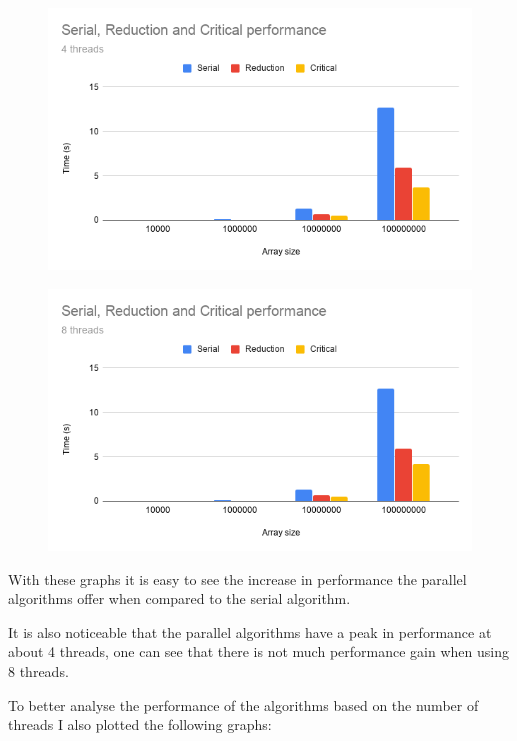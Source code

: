 \documentclass[unicode,11pt,a4paper,oneside,numbers=endperiod,openany]{scrartcl}
\begin{document}
\begin{enumerate}
        \begin{figure}[H]
            \centering
            \includegraphics[width=0.9\linewidth]{"Serial, Reduction and Critical Performance-3"}
        \end{figure}

        \begin{figure}[H]
            \centering
            \includegraphics[width=0.9\linewidth]{"Serial, Reduction and Critical Performance-4"}
        \end{figure}

    With these graphs it is easy to see the increase in performance the parallel algorithms offer when compared to the serial algorithm. 

    It is also noticeable that the parallel algorithms have a peak in performance at about 4 threads, one can see that there is not much performance gain when using 8 threads.


    To better analyse the performance of the algorithms based on the number of threads I also plotted the following graphs:


\end{enumerate}
\end{document}
